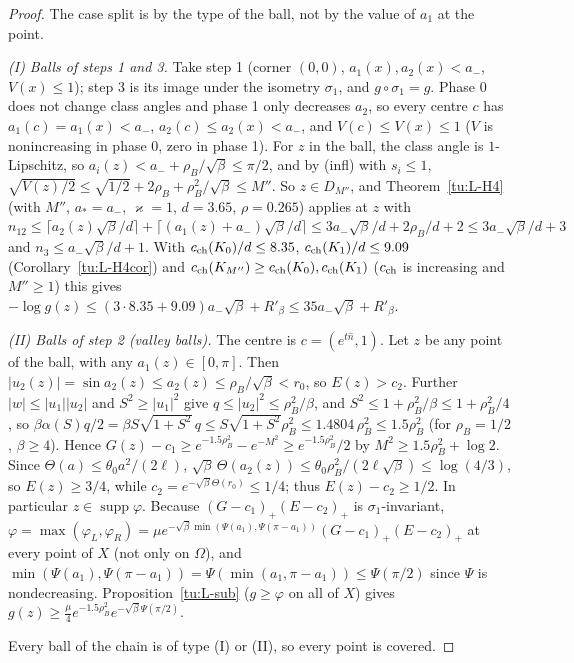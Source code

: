 \begin{proof}
The case split is by the type of the ball, not by the value of $a_1$ at the point.

\emph{(I) Balls of steps 1 and 3.} Take step 1 (corner $(0,0)$, $a_1(x),a_2(x)<a_-$, $V(x)\le1$); step 3 is its image under the
isometry $\sigma_1$, and $g\circ\sigma_1=g$. Phase 0 does not change class angles and phase 1 only decreases $a_2$, so every centre $c$
has $a_1(c)=a_1(x)<a_-$, $a_2(c)\le a_2(x)<a_-$, and $V(c)\le V(x)\le1$ ($V$ is nonincreasing in phase 0, zero in phase 1).
For $z$ in the ball, the class angle is $1$-Lipschitz, so $a_i(z)<a_-+\rho_B/\sqrt\beta\le\pi/2$, and by (infl) with $s_i\le1$,
$\sqrt{V(z)/2}\le\sqrt{1/2}+2\rho_B+\rho_B^2/\sqrt\beta\le M''$. So $z\in D_{M''}$, and Theorem~\ref{tu:L-H4} (with $M''$, $a_*=a_-$,
$\varkappa=1$, $d=3.65$, $\rho=0.265$) applies at $z$ with
$n_{12}\le\lceil a_2(z)\sqrt\beta/d\rceil+\lceil(a_1(z)+a_-)\sqrt\beta/d\rceil\le3a_-\sqrt\beta/d+2\rho_B/d+2\le3a_-\sqrt\beta/d+3$ and
$n_3\le a_-\sqrt\beta/d+1$. With $c_{\rm ch}(K_0)/d\le8.35$, $c_{\rm ch}(K_1)/d\le9.09$ (Corollary~\ref{tu:L-H4cor}) and
$c_{\rm ch}(K_{M''})\ge c_{\rm ch}(K_0),c_{\rm ch}(K_1)$ ($c_{\rm ch}$ is increasing and $M''\ge1$) this gives
$-\log g(z)\le(3\cdot8.35+9.09)a_-\sqrt\beta+R'_\beta\le35a_-\sqrt\beta+R'_\beta$.

\emph{(II) Balls of step 2 (valley balls).} The centre is $c=(e^{t\hat n},1)$. Let $z$ be any point of the ball, with any $a_1(z)\in[0,\pi]$.
Then $|u_2(z)|=\sin a_2(z)\le a_2(z)\le\rho_B/\sqrt\beta<r_0$, so $E(z)>c_2$. Further $|w|\le|u_1||u_2|$ and $S^2\ge|u_1|^2$ give
$q\le|u_2|^2\le\rho_B^2/\beta$, and $S^2\le1+\rho_B^2/\beta\le1+\rho_B^2/4$, so
$\beta\alpha(S)q/2=\beta S\sqrt{1+S^2}\,q\le S\sqrt{1+S^2}\rho_B^2\le1.4804\,\rho_B^2\le1.5\rho_B^2$ (for $\rho_B=1/2$, $\beta\ge4$).
Hence $G(z)-c_1\ge e^{-1.5\rho_B^2}-e^{-M^2}\ge e^{-1.5\rho_B^2}/2$ by $M^2\ge1.5\rho_B^2+\log2$. Since
$\Theta(a)\le\theta_0a^2/(2\ell)$, $\sqrt\beta\,\Theta(a_2(z))\le\theta_0\rho_B^2/(2\ell\sqrt\beta)\le\log(4/3)$, so $E(z)\ge3/4$, while
$c_2=e^{-\sqrt\beta\Theta(r_0)}\le1/4$; thus $E(z)-c_2\ge1/2$. In particular $z\in\operatorname{supp}\varphi$. Because
$(G-c_1)_+(E-c_2)_+$ is $\sigma_1$-invariant, $\varphi=\max(\varphi_L,\varphi_R)=\mu e^{-\sqrt\beta\min(\Psi(a_1),\Psi(\pi-a_1))}(G-c_1)_+(E-c_2)_+$
at every point of $X$ (not only on $\Omega$), and $\min(\Psi(a_1),\Psi(\pi-a_1))=\Psi(\min(a_1,\pi-a_1))\le\Psi(\pi/2)$ since $\Psi$ is
nondecreasing. Proposition~\ref{tu:L-sub} ($g\ge\varphi$ on all of $X$) gives
$g(z)\ge\frac\mu4e^{-1.5\rho_B^2}e^{-\sqrt\beta\Psi(\pi/2)}$.

Every ball of the chain is of type (I) or (II), so every point is covered.
\end{proof}


